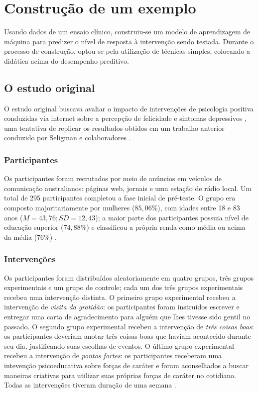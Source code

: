 \chapter{Construção de um exemplo}

Usando dados de um ensaio clínico, construiu-se um modelo de aprendizagem de máquina para predizer o nível de resposta à intervenção sendo testada.
Durante o processo de construção, optou-se pela utilização de técnicas simples, colocando a didática acima do desempenho preditivo.

\section{O estudo original}

O estudo original buscava avaliar o impacto de intervenções de psicologia positiva conduzidas via internet sobre a percepção de felicidade e
sintomas depressivos \cite{Woodworth2017}, uma tentativa de replicar os resultados obtidos em um trabalho anterior conduzido por Seligman e
colaboradores \cite{Seligman2005}.

\subsection{Participantes}

Os participantes foram recrutados por meio de anúncios em veículos de comunicação australianos: páginas web, jornais e uma estação de rádio
local. Um total de 295 participantes completou a fase inicial de pré-teste. O grupo era composto majoritariamente por mulheres ($85,06\%$),
com idades entre 18 e 83 anos ($M=43,76; SD=12,43$); a maior parte dos participantes possuia nível de educação superior ($74,88\%$) e classificou
a própria renda como média ou acima da média ($76\%$) \cite{Woodworth2017, Collins2023}.

\subsection{Intervenções}

Os participantes foram distribuídos aleatoriamente em quatro grupos, três grupos experimentais e um grupo de controle; cada um dos três grupos
experimentais recebeu uma intervenção distinta. O primeiro grupo experimental recebeu a intervenção de \emph{visita da gratidão}: os participantes
foram instruídos escrever e entregar uma carta de agradecimento para alguém que lhes tivesse sido gentil no passado. O segundo grupo experimental
recebeu a intervenção de \emph{três coisas boas}: os participantes deveriam anotar três coisas boas que haviam acontecido durante seu dia, justificando
suas escolhas de eventos. O último grupo experimental recebeu a intervenção de \emph{pontos fortes}: os participantes receberam uma intevenção
psicoeducativa sobre forças de caráter e foram aconselhados a buscar maneiras criativas para utilizar suas próprias forças de caráter no cotidiano.
Todas as intervenções tiveram duração de uma semana \cite{Woodworth2017}.

